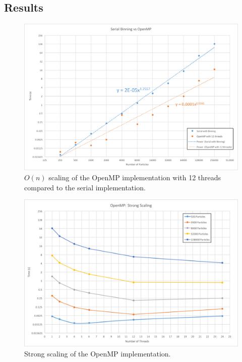 \documentclass[12pt]{article}
\begin{document}
\subsection{Results}

\begin{figure}
\includegraphics[width=\textwidth]{graphs/serial_binning_vs_openMP_12thr.png}
  \caption{$O(n)$ scaling of the OpenMP implementation with 12 threads compared to the serial implementation.}
  \label{fig:openmp-on}
\end{figure}

\begin{figure}
\includegraphics[width=\textwidth]{graphs/openmp_strong_scaling.png}
  \caption{Strong scaling of the OpenMP implementation.}
  \label{fig:openmp-strong}
\end{figure}
\end{document}
